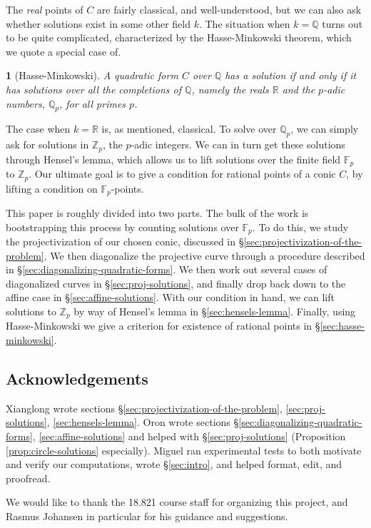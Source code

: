 \documentclass[10pt,a4paper]{amsart}
\numberwithin{equation}{section}
\numberwithin{figure}{section}
\theoremstyle{definition}
\theoremstyle{plain}
\newtheorem{thm}{\protect\theoremname}[section]
\theoremstyle{remark}
\theoremstyle{plain}
\theoremstyle{definition}
\theoremstyle{plain}
\theoremstyle{plain}
\providecommand{\theoremname}{Theorem}
\newcommand{\F}{\mathbb{F}}
\newcommand{\Z}{\mathbb{Z}}
\newcommand{\Q}{\mathbb{Q}}
\newcommand{\R}{\mathbb{R}}
\begin{document}
	The \emph{real} points of $C$ are fairly classical, and well-understood,
	but we can also ask whether solutions exist in some other
	field $k$. The situation when $k=\Q$ turns out to be quite complicated,
	characterized by the Hasse-Minkowski theorem, which we quote a special
	case of.
	\begin{thm}[Hasse-Minkowski]
		A quadratic form $C$ over $\Q$ has a solution if and only if it has solutions
		over all the completions of $\Q$, namely the reals $\R$ and the $p$-adic
		numbers, $\Q_p$, for all primes $p$.
	\end{thm}
	The case when $k = \R$ is, as mentioned, classical. To solve over $\Q_p$,
	we can simply ask for solutions in $\Z_p$, the $p$-adic integers. We
	can in turn get these solutions through Hensel's lemma, which allows us
	to lift solutions over the finite field $\F_p$ to $\Z_p$. Our ultimate
	goal is to give a condition for rational points of a conic $C$, by lifting
	a condition on $\F_p$-points.
	
	This paper is roughly divided into two parts. The bulk of the work 
	is bootstrapping this process by counting solutions over $\F_p$. To do this,
	we study the projectivization of our chosen conic, discussed in
	\S\ref{sec:projectivization-of-the-problem}. We then diagonalize 
	the projective curve through a procedure described in 
	\S\ref{sec:diagonalizing-quadratic-forms}. We then work out several cases
	of diagonalized curves in \S\ref{sec:proj-solutions}, and finally
	drop back down to the affine case in \S\ref{sec:affine-solutions}.
	With our condition in hand, we can lift solutions to $\Z_p$ by way of
	Hensel's lemma in \S\ref{sec:hensels-lemma}. Finally, using Hasse-Minkowski we give a criterion for 
	existence of rational points in 
	\S\ref{sec:hasse-minkowski}.

	\subsection*{Acknowledgements} Xianglong wrote sections \S\ref{sec:projectivization-of-the-problem}, \ref{sec:proj-solutions}, \ref{sec:hensels-lemma}. Oron wrote sections \S\ref{sec:diagonalizing-quadratic-forms}, \ref{sec:affine-solutions} and helped with \S\ref{sec:proj-solutions} (Proposition \ref{prop:circle-solutions} especially). Miguel ran experimental tests to both motivate and verify our computations, wrote \S\ref{sec:intro}, and helped format, edit, and proofread.
	
	We would like to thank the 18.821 course staff for organizing this project, and Rasmus Johansen in particular for his guidance and suggestions.    
\end{document}
